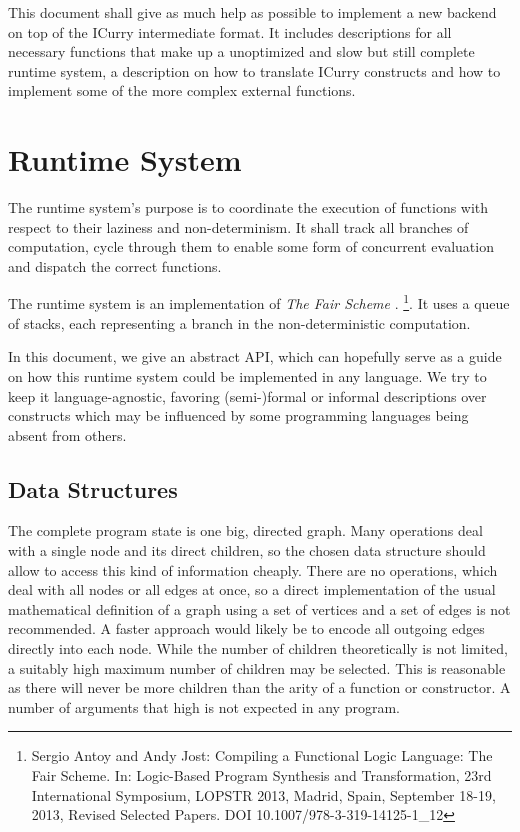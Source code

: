 This document shall give as much help as possible to implement a new backend on top of the ICurry intermediate format.
It includes descriptions for all necessary functions that make up a unoptimized and slow but still complete runtime system, a description on how to translate ICurry constructs and how to implement some of the more complex external functions.

\section{Runtime System}

The runtime system's purpose is to coordinate the execution of functions with respect to their laziness and non-determinism.
It shall track all branches of computation, cycle through them to enable some form of concurrent evaluation and dispatch the correct functions.

The runtime system is an implementation of \emph{The Fair Scheme}
\ifdefined\isthesis
\cite{fairscheme}.
\else
\footnote{Sergio Antoy and Andy Jost: Compiling a Functional Logic Language: The Fair Scheme. In: Logic-Based Program Synthesis and Transformation, 23rd International Symposium, LOPSTR 2013, Madrid, Spain, September 18-19, 2013, Revised Selected Papers. DOI 10.1007/978-3-319-14125-1\_12}.
\fi
It uses a queue of stacks, each representing a branch in the non-deterministic computation.

In this document, we give an abstract API, which can hopefully serve as a guide on how this runtime system could be implemented in any language.
We try to keep it language-agnostic, favoring (semi-)formal or informal descriptions over constructs which may be influenced by some programming languages being absent from others.

\subsection{Data Structures}

The complete program state is one big, directed graph.
Many operations deal with a single node and its direct children, so the chosen data structure should allow to access this kind of information cheaply.
There are no operations, which deal with all nodes or all edges at once, so a direct implementation of the usual mathematical definition of a graph using a set of vertices and a set of edges is not recommended.
A faster approach would likely be to encode all outgoing edges directly into each node.
While the number of children theoretically is not limited, a suitably high maximum number of children may be selected.
This is reasonable as there will never be more children than the arity of a function or constructor.
A number of arguments that high is not expected in any program.

